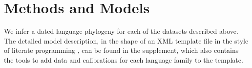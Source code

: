\documentclass[a4paper,12pt]{scrartcl}
\begin{document}

\section{Methods and Models}\label{s:methods}
We infer a dated language phylogeny for each of the datasets described above.
The detailed model description, in the shape of an XML template file in the
style of literate programming \parencite{knuth1984literate}, can be found in the supplement,
which also contains the tools to add data and calibrations for each language
family to the template.
\end{document}
